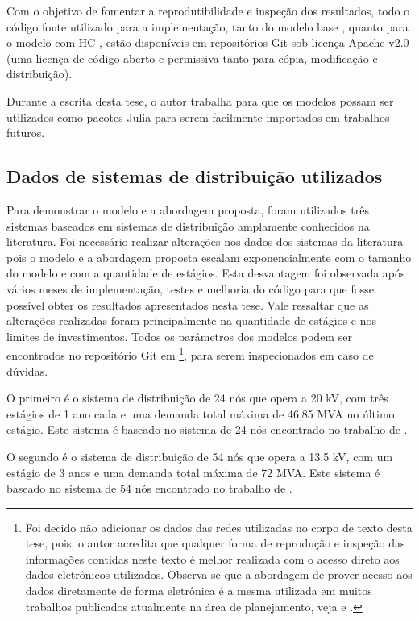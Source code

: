 Com o objetivo de fomentar a reprodutibilidade e inspeção dos resultados, todo o código fonte utilizado para a implementação, tanto do modelo base \cite{modelobase}, quanto para o modelo com \ac{HC} \cite{modelocomHC}, estão disponíveis em repositórios Git sob licença Apache v2.0 (uma licença de código aberto e permissiva tanto para cópia, modificação e distribuição). 

Durante a escrita desta tese, o autor trabalha para que os modelos possam ser utilizados como pacotes Julia para serem facilmente importados em trabalhos futuros.


\subsection{Dados de sistemas de distribuição utilizados}

Para demonstrar o modelo e a abordagem proposta, foram utilizados três sistemas baseados em sistemas de distribuição amplamente conhecidos na literatura. Foi necessário realizar alterações nos dados dos sistemas da literatura pois o modelo e a abordagem proposta escalam exponencialmente com o tamanho do modelo e com a quantidade de estágios. Esta desvantagem foi observada após vários meses de implementação, testes e melhoria do código para que fosse possível obter os resultados apresentados nesta tese. Vale ressaltar que as alterações realizadas foram principalmente na quantidade de estágios e nos limites de investimentos. Todos os parâmetros dos modelos podem ser encontrados no repositório Git em \cite{modelocomHC}\footnote{Foi decido não adicionar os dados das redes utilizadas no corpo de texto desta tese, pois, o autor acredita que qualquer forma de reprodução e inspeção das informações contidas neste texto é melhor realizada com o acesso direto aos dados eletrônicos utilizados. Observa-se que a abordagem de prover acesso aos dados diretamente de forma eletrônica é a mesma utilizada em muitos trabalhos publicados atualmente na área de planejamento, veja  e .}, para serem inspecionados em caso de dúvidas.

O primeiro é o sistema de distribuição de 24 nós que opera a 20 kV, com três estágios de 1 ano cada e uma demanda total máxima de 46,85 MVA no último estágio. Este sistema é baseado no sistema de 24 nós encontrado no trabalho de  .

O segundo é o sistema de distribuição de 54 nós que opera a 13.5 kV, com um estágio de 3 anos e uma demanda total máxima de 72 MVA. Este sistema é baseado no sistema de 54 nós encontrado no trabalho de  .

